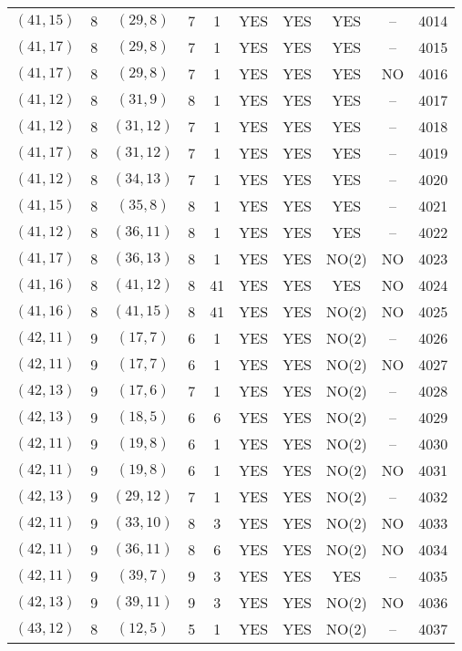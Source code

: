 \begin{longtable}{|c|c|c|c|c|c|c|c|c|c|}
$(41, 15)$ & 8 & $(29, 8)$ & 7 & 1 & YES & YES & YES & -- & 4014\\
$(41, 17)$ & 8 & $(29, 8)$ & 7 & 1 & YES & YES & YES & -- & 4015\\
$(41, 17)$ & 8 & $(29, 8)$ & 7 & 1 & YES & YES & YES & NO & 4016\\
$(41, 12)$ & 8 & $(31, 9)$ & 8 & 1 & YES & YES & YES & -- & 4017\\
$(41, 12)$ & 8 & $(31, 12)$ & 7 & 1 & YES & YES & YES & -- & 4018\\
$(41, 17)$ & 8 & $(31, 12)$ & 7 & 1 & YES & YES & YES & -- & 4019\\
$(41, 12)$ & 8 & $(34, 13)$ & 7 & 1 & YES & YES & YES & -- & 4020\\
$(41, 15)$ & 8 & $(35, 8)$ & 8 & 1 & YES & YES & YES & -- & 4021\\
$(41, 12)$ & 8 & $(36, 11)$ & 8 & 1 & YES & YES & YES & -- & 4022\\
$(41, 17)$ & 8 & $(36, 13)$ & 8 & 1 & YES & YES & NO(2) & NO & 4023\\
$(41, 16)$ & 8 & $(41, 12)$ & 8 & 41 & YES & YES & YES & NO & 4024\\
$(41, 16)$ & 8 & $(41, 15)$ & 8 & 41 & YES & YES & NO(2) & NO & 4025\\
$(42, 11)$ & 9 & $(17, 7)$ & 6 & 1 & YES & YES & NO(2) & -- & 4026\\
$(42, 11)$ & 9 & $(17, 7)$ & 6 & 1 & YES & YES & NO(2) & NO & 4027\\
$(42, 13)$ & 9 & $(17, 6)$ & 7 & 1 & YES & YES & NO(2) & -- & 4028\\
$(42, 13)$ & 9 & $(18, 5)$ & 6 & 6 & YES & YES & NO(2) & -- & 4029\\
$(42, 11)$ & 9 & $(19, 8)$ & 6 & 1 & YES & YES & NO(2) & -- & 4030\\
$(42, 11)$ & 9 & $(19, 8)$ & 6 & 1 & YES & YES & NO(2) & NO & 4031\\
$(42, 13)$ & 9 & $(29, 12)$ & 7 & 1 & YES & YES & NO(2) & -- & 4032\\
$(42, 11)$ & 9 & $(33, 10)$ & 8 & 3 & YES & YES & NO(2) & NO & 4033\\
$(42, 11)$ & 9 & $(36, 11)$ & 8 & 6 & YES & YES & NO(2) & NO & 4034\\
$(42, 11)$ & 9 & $(39, 7)$ & 9 & 3 & YES & YES & YES & -- & 4035\\
$(42, 13)$ & 9 & $(39, 11)$ & 9 & 3 & YES & YES & NO(2) & NO & 4036\\
$(43, 12)$ & 8 & $(12, 5)$ & 5 & 1 & YES & YES & NO(2) & -- & 4037\\

\end{longtable}
